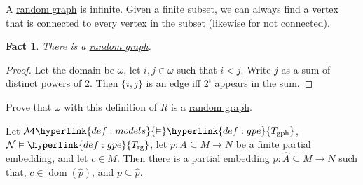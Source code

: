 \documentclass{article}
\let\models\vDash
\DeclareMathOperator{\dom}{dom}
\newtheorem{nfact}[nthm]{Fact}
\begin{document}
\begin{remark}
  A \hyperlink{def:rgraph}{random graph} is infinite.
  Given a finite subset, we can always find a vertex that is connected to every vertex in the subset (likewise for not connected).
\end{remark}
\begin{nfact}\label{fact:4.15}
  There is a \hyperlink{def:rgraph}{random graph}.
\end{nfact}
\begin{proof}
  Let the domain be $\omega$, let $i,j \in \omega$ such that $i < j$.
  Write $j$ as a sum of distinct powers of $2$.
  Then $\{i,j\}$ is an edge iff $2^i$ appears in the sum.
\end{proof}
\begin{exercise}
  Prove that $\omega$ with this definition of $R$ is a \hyperlink{def:rgraph}{random graph}.
\end{exercise}
\begin{nlemma}\label{lem:4.17}
  Let $\mathcal{M} \hyperlink{def:models}{\models} \hyperlink{def:gpe}{T_{\text{gph}}}$, $\mathcal{N} \models \hyperlink{def:gpe}{T_{\text{rg}}}$, let $p: A \subseteq M \to N$ be a \hyperlink{def:gpe}{finite partial embedding}, and let $c \in M$.
  Then there is a partial embedding $\hat{p}: \hat{A} \subseteq M \to N$ such that, $c \in \dom(\hat{p})$, and $p \subseteq \hat{p}$.
\end{nlemma}
\end{document}
